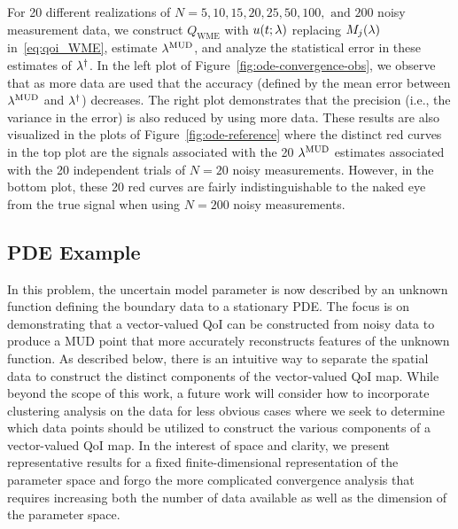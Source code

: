 For 20 different realizations of $N=5, 10, 15, 20, 25, 50, 100, \text{ and } 200$ noisy measurement data, we construct $Q_\text{WME}$ with $u(t;\lambda)$ replacing $M_j(\lambda)$ in~\eqref{eq:qoi_WME}, estimate $\lambda^{\text{MUD}}$, and analyze the statistical error in these estimates of $\lambda^\dagger$.
In the left plot of Figure~\ref{fig:ode-convergence-obs}, we observe that as more data are used that the accuracy (defined by the mean error between $\lambda^{\text{MUD}}$ and $\lambda^\dagger$) decreases.
The right plot demonstrates that the precision (i.e., the variance in the error) is also reduced by using more data.
These results are also visualized in the plots of Figure~\ref{fig:ode-reference} where the distinct red curves in the top plot are the signals associated with the 20 $\lambda^{\text{MUD}}$ estimates associated with the 20 independent trials of $N=20$ noisy measurements.
However, in the bottom plot, these 20 red curves are fairly indistinguishable to the naked eye from the true signal when using $N=200$ noisy measurements.

\FloatBarrier
\subsection{PDE Example}\label{subsec:pde-example}

In this problem, the uncertain model parameter is now described by an unknown function defining the boundary data to a stationary PDE.
The focus is on demonstrating that a vector-valued QoI can be constructed from noisy data to produce a MUD point that more accurately reconstructs features of the unknown function.
As described below, there is an intuitive way to separate the spatial data to construct the distinct components of the vector-valued QoI map.
While beyond the scope of this work, a future work will consider how to incorporate clustering analysis on the data for less obvious cases where we seek to determine which data points should be utilized to construct the various components of a vector-valued QoI map.
In the interest of space and clarity, we present representative results for a fixed finite-dimensional representation of the parameter space and forgo the more complicated convergence analysis that requires increasing both the number of data available as well as the dimension of the parameter space.

